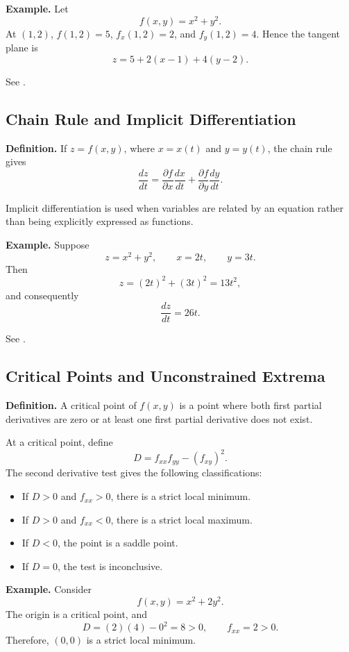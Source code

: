 \documentclass[a4paper,12pt]{article}
\theoremstyle{mystyle}
\numberwithin{equation}{section}
\numberwithin{theorem}{section}
\numberwithin{proposition}{section}
\numberwithin{example}{section}
\numberwithin{remark}{section}
\numberwithin{lemma}{section}
\numberwithin{corollary}{section}
\numberwithin{definition}{section}
\begin{document}
\textbf{Example.}
Let
\[
    f(x,y)=x^2+y^2.
\]
At $(1,2)$, $f(1,2)=5$, $f_x(1,2)=2$, and $f_y(1,2)=4$.
Hence the tangent plane is
\[
    z=5+2(x-1)+4(y-2).
\]

See \cite[Section~4.4]{openstaxtangent}.

\subsection{Chain Rule and Implicit Differentiation}

\textbf{Definition.}
If $z=f(x,y)$, where $x=x(t)$ and $y=y(t)$, the chain rule gives
\[
    \frac{dz}{dt}
    =\frac{\partial f}{\partial x}\frac{dx}{dt}
     +\frac{\partial f}{\partial y}\frac{dy}{dt}.
\]

Implicit differentiation is used when variables are related by an
equation rather than being explicitly expressed as functions.

\textbf{Example.}
Suppose
\[
    z=x^2+y^2,\qquad x=2t,\qquad y=3t.
\]
Then
\[
    z=(2t)^2+(3t)^2=13t^2,
\]
and consequently
\[
    \frac{dz}{dt}=26t.
\]

See \cite[Section~4.5]{openstaxchain}.

\subsection{Critical Points and Unconstrained Extrema}

\textbf{Definition.}
A critical point of $f(x,y)$ is a point where both first partial
derivatives are zero or at least one first partial derivative
does not exist.

At a critical point, define
\[
    D=f_{xx}f_{yy}-(f_{xy})^2.
\]
The second derivative test gives the following classifications:
\begin{itemize}
    \item If $D>0$ and $f_{xx}>0$, there is a strict local minimum.
    \item If $D>0$ and $f_{xx}<0$, there is a strict local maximum.
    \item If $D<0$, the point is a saddle point.
    \item If $D=0$, the test is inconclusive.
\end{itemize}

\textbf{Example.}
Consider
\[
    f(x,y)=x^2+2y^2.
\]
The origin is a critical point, and
\[
    D=(2)(4)-0^2=8>0,\qquad f_{xx}=2>0.
\]
Therefore, $(0,0)$ is a strict local minimum.
\end{document}
